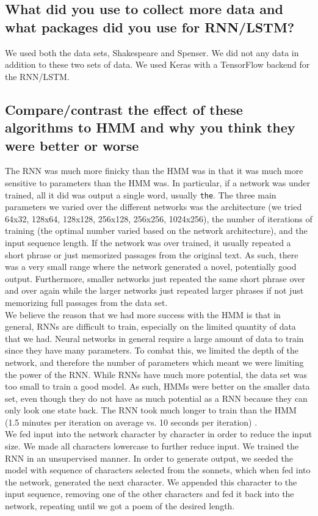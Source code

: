 \subsection{What did you use to collect more data and what packages did you use for RNN/LSTM?}
We used both the data sets, Shakespeare and Spenser. We did not any data in addition to these two sets of data. We used Keras with a TensorFlow backend for the RNN/LSTM.
\subsection{Compare/contrast the effect of these algorithms to HMM and why you think they were better or worse}
The RNN was much more finicky than the HMM was in that it was much more sensitive to parameters than the HMM was. In particular, if a network was under trained, all it did was output a single word, usually \texttt{the}. The three main parameters we varied over the different networks was the architecture (we tried 64x32, 128x64, 128x128, 256x128, 256x256, 1024x256), the number of iterations of training (the optimal number varied based on the network architecture), and the input sequence length. If the network was over trained, it usually repeated a short phrase or just memorized passages from the original text. As such, there was a very small range where the network generated a novel, potentially good output. Furthermore, smaller networks just repeated the same short phrase over and over again while the larger networks just repeated larger phrases if not just memorizing full passages from the data set. \\
\indent We believe the reason that we had more success with the HMM is that in general, RNNs are difficult to train, especially on the limited quantity of data that we had. Neural networks in general require a large amount of data to train since they have many parameters. To combat this, we limited the depth of the network, and therefore the number of parameters which meant we were limiting the power of the RNN. While RNNs have much more potential, the data set was too small to train a good model. As such, HMMs were better on the smaller data set, even though they do not have as much potential as a RNN because they can only look one state back. The RNN took much longer to train than the HMM (1.5 minutes per iteration on average vs. 10 seconds per iteration) . \\
\indent We fed input into the network character by character in order to reduce the input size. We made all characters lowercase to further reduce input. We trained the RNN in an unsupervised manner. In order to generate output, we seeded the model with sequence of characters selected from the sonnets, which when fed into the network, generated the next character. We appended this character to the input sequence, removing one of the other characters and fed it back into the network, repeating until we got a poem of the desired length. \\
